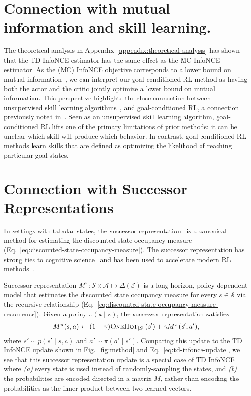\documentclass{article} %
\begin{document}
\section{Connection with mutual information and skill learning.}
\label{appendix:mi}

The theoretical analysis in Appendix~\ref{appendix:theoretical-analysis} has shown that the TD InfoNCE estimator has the same effect as the MC InfoNCE estimator. As the (MC) InfoNCE objective corresponds to a lower bound on mutual information~\citep{poole2019variational}, we can interpret our goal-conditioned RL method as having both the actor and the critic jointly optimize a lower bound on mutual information. This perspective highlights the close connection between unsupervised skill learning algorithms~\citep{eysenbach2018diversity, campos2020explore, warde2018unsupervised, gregor2016variational}, and goal-conditioned RL, a connection previously noted in~\citet{choi2021variational}. Seen as an unsupervised skill learning algorithm, goal-conditioned RL lifts one of the primary limitations of prior methods: it can be unclear which skill will produce which behavior. In contrast, goal-conditioned RL methods learn skills that are defined as optimizing the likelihood of reaching particular goal states.

\section{Connection with Successor Representations}
\label{appendix:sr}

In settings with tabular states, the successor representation~\citep{dayan1993improving} is a canonical method for estimating the discounted state occupancy measure (Eq.~\ref{eq:discounted-state-occupancy-measure}). The successor representation has strong ties to cognitive science~\citep{gershman2018successor} and has been used to accelerate modern RL methods~\citep{barreto2017successor, touati2021learning}.

Successor representation $M^{\pi}: \mathcal{S} \times \mathcal{A} \mapsto \Delta(\mathcal{S})$ is a long-horizon, policy dependent model that estimates the discounted state occupancy measure for every $s \in \mathcal{S}$ via the recursive relationship (Eq.~\ref{eq:discounted-state-occupancy-measure-recurrence}). Given a policy $\pi(a \mid s)$, the successor representation satisfies
\begin{align}
    M^{\pi}(s, a) \gets (1 - \gamma) \textsc{OneHot}_{|\mathcal{S}|}(s') + \gamma M^{\pi}(s', a'),
    \label{eq:sr}
\end{align}
where $s' \sim p(s' \mid s, a)$ and $a' \sim \pi(a' \mid s')$.
Comparing this update to the TD InfoNCE update shown in Fig.~\ref{fig:method} and Eq.~\ref{eq:td-infonce-update}, we see that this successor representation update is a special case of TD InfoNCE where \emph{(a)} every state is used instead of randomly-sampling the states, and \emph{(b)} the probabilities are encoded directed in a matrix $M$, rather than encoding the probabilities as the inner product between two learned vectors.
\end{document}

